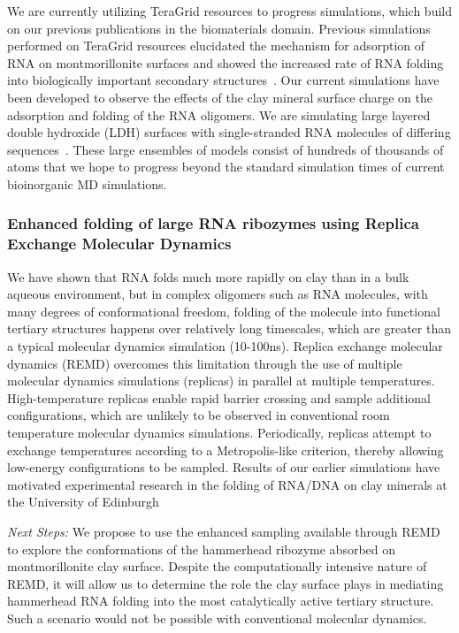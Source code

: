\documentclass[a4paper,10pt]{article}
\begin{document}
We are currently utilizing TeraGrid resources to progress simulations, which build on our previous publications in the biomaterials domain. Previous simulations performed on TeraGrid resources elucidated the mechanism for adsorption of RNA on montmorillonite surfaces and showed the increased rate of RNA folding into biologically important secondary structures~\cite{Ref9}. Our current simulations have been developed to observe the effects of the clay mineral surface charge on the adsorption and folding of the RNA oligomers. We are simulating large layered double hydroxide (LDH) surfaces with single-stranded RNA molecules of differing sequences~\cite{Ref10}. These large ensembles of models consist of hundreds of thousands of atoms that we hope to progress beyond the standard simulation times of current bioinorganic MD simulations.

\subsubsection{Enhanced folding of large RNA ribozymes using Replica Exchange Molecular Dynamics}

We have shown that RNA folds much more rapidly on clay than in a bulk aqueous environment,
but in complex oligomers such as RNA molecules, with many degrees of conformational freedom, folding of the molecule into functional tertiary structures happens over relatively long timescales, which are greater than a typical molecular dynamics simulation (10-100ns). Replica exchange molecular dynamics (REMD) overcomes this limitation through the use of multiple molecular dynamics simulations (replicas) in parallel at multiple temperatures. High-temperature replicas enable rapid barrier crossing and sample additional configurations, which are unlikely to be observed in conventional room temperature molecular dynamics simulations. Periodically, replicas attempt to exchange temperatures according to a Metropolis-like criterion, thereby allowing low-energy configurations to be sampled. Results of our earlier simulations have motivated experimental research in the folding of RNA/DNA on clay minerals at the University of Edinburgh

{\it Next Steps:} We propose to use the enhanced sampling available through REMD to explore the conformations of the hammerhead ribozyme absorbed on montmorillonite clay surface. Despite the computationally intensive nature of REMD, it will allow us to determine the role the clay surface plays in mediating hammerhead RNA folding into the most catalytically active tertiary structure. Such a scenario would not be possible with conventional molecular dynamics.
\end{document}
